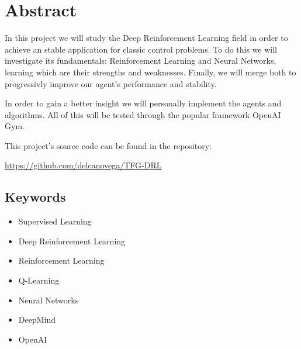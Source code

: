 \chapter*{Abstract}

In this project we will study the Deep Reinforcement Learning field in order to achieve an stable application for classic control problems. To do this we will investigate its fundamentals: Reinforcement Learning and Neural Networks, learning which are their strengths and weaknesses. Finally, we will merge both to progressivly improve our agent's performance and stability.

In order to gain a better insight we will personally implement the agents and algorithms. All of this will be tested through the popular framework OpenAI Gym. 

This project's source code can be found in the repository:

\url{https://github.com/delcanovega/TFG-DRL}

\section*{Keywords}

\begin{itemize}
    \item Supervised Learning
    \item Deep Reinforcement Learning
    \item Reinforcement Learning
    \item Q-Learning
    \item Neural Networks
    \item DeepMind 
    \item OpenAI
\end{itemize}
   



